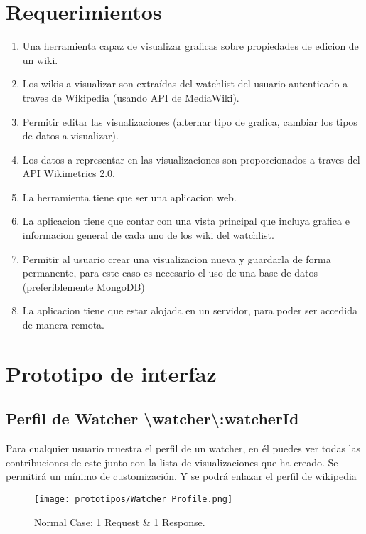 \section{Requerimientos}
    \begin{enumerate}
        \item{Una herramienta capaz de visualizar graficas sobre propiedades de edicion de un wiki.}
        \item{Los wikis a visualizar son extraídas del watchlist del usuario autenticado a traves de Wikipedia (usando API de MediaWiki).}
        \item{Permitir editar las visualizaciones (alternar tipo de grafica, cambiar los tipos de datos a visualizar).}
        \item{Los datos a representar en las visualizaciones son proporcionados a traves del API Wikimetrics 2.0.}
        \item{La herramienta tiene que ser una aplicacion web.}
        \item{La aplicacion tiene que contar con una vista principal que incluya grafica e informacion general de cada uno de los wiki del watchlist.}
        \item{Permitir al usuario crear una visualizacion nueva y guardarla de forma permanente, para este caso es necesario el uso de una base de datos (preferiblemente MongoDB)}
        \item{La aplicacion tiene que estar alojada en un servidor, para poder ser accedida de manera remota.}
    \end{enumerate}

\section{Prototipo de interfaz}

\subsection{Perfil de Watcher \textbackslash watcher\textbackslash:watcherId}
Para cualquier usuario muestra el perfil de un watcher, en él puedes ver todas las contribuciones de este junto con la lista de visualizaciones que ha creado.
Se permitirá un mínimo de customización. Y se podrá enlazar el perfil de wikipedia

\begin{figure}[ht]
    \centering
         \texttt{[image: prototipos/Watcher Profile.png]}
          \caption{Normal Case: 1 Request \& 1 Response.}
           \label{normal_case}
\end{figure}


